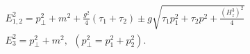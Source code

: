 \begin{equation}
\label{11} 
\begin{array}{c}
E_{1,2}^2=p_{\bot }^2+m^2+ 
\frac{g^2}4\left( \tau _1+\tau _2\right) \pm g\sqrt{\tau _1p_1^2+\tau _2p^2+ 
\frac{\left( H_z^3\right) ^2}4} \\ E_3^2=p_{\bot }^2+m^2,\ \ \left( p_{\bot
}^2=p_1^2+p_2^2\right) . 
\end{array}
\end{equation}

